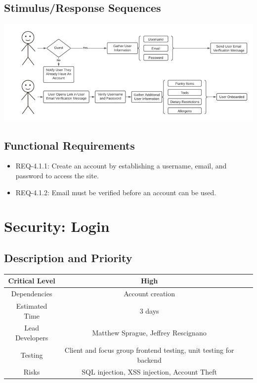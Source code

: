 \documentclass{scrreprt}
\begin{document}
\subsection{Stimulus/Response Sequences}

\includegraphics{FlowCharts/Security-Account-Creation.png}

\subsection{Functional Requirements}

\begin{itemize}
    \item REQ-4.1.1: Create an account by establishing a username, email, and password to access the site.
    \item REQ-4.1.2: Email must be verified before an account can be used.    
\end{itemize}

\section{Security: Login}

\subsection{Description and Priority}
\begin{center}
    \begin{tabular}{| c | c | c | c |}
        \hline
        Critical Level & High \\
        \hline
        Dependencies & Account creation \\
        \hline
        Estimated Time & 3 days \\
        \hline
        Lead Developers & Matthew Sprague, Jeffrey Rescignano \\
        \hline
        Testing & Client and focus group frontend testing, unit testing for backend \\
        \hline
        Risks & SQL injection, XSS injection, Account Theft \\
        \hline
    \end{tabular}
\end{center}
\end{document}

